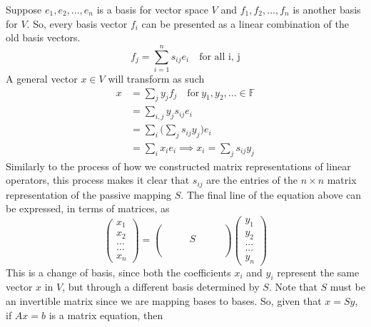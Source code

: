\documentclass{article}
\begin{document}
    Suppose ${e_1, e_2, ..., e_n}$ is a basis for vector space $V$ and ${f_1, f_2, ..., f_n}$ is another basis for $V$. So, every basis vector $f_i$ can be presented as a linear combination of the old basis vectors. 
    \begin{equation}
      f_j = \sum_{i =1}^{n} s_{i j} e_i \quad \text{for all i, j}
    \end{equation}
    A general vector $x \in V$ will transform as such
    \begin{equation} 
      \label{eq1}
      \begin{split}
        x & = \sum_{j} y_j f_j \quad \text{for} \ y_{1}, y_{2}, ... \in \mathbb{F} \\
        & = \sum_{i,j} y_j s_{i j} e_i \\
        & = \sum_{i} \Big( \sum_{j} s_{i j} y_j \Big) e_i \\
        & = \sum_{i} x_i e_i \implies x_i = \sum_{j} s_{i j} y_j
      \end{split}
    \end{equation}
    Similarly to the process of how we constructed matrix representations of linear operators, this process makes it clear that $s_{i j}$ are the entries of the $n \times n$ matrix representation of the passive mapping $S$. The final line of the equation above can be expressed, in terms of matrices, as 
    \begin{equation}
      \begin{pmatrix}x_1\\x_2\\...\\...\\x_n\end{pmatrix} = 
      \begin{pmatrix} \\ \\ & & & S & & &  \\\\\\\end{pmatrix} \begin{pmatrix}
      y_1\\y_2\\...\\...\\y_n\end{pmatrix}
    \end{equation}
    This is a change of basis, since both the coefficients $x_i$ and $y_i$ represent the same vector $x$ in $V$, but through a different basis determined by $S$. Note that $S$ must be an invertible matrix since we are mapping bases to bases. So, given that $x = S y$, if $Ax = b$ is a matrix equation, then
\end{document}
